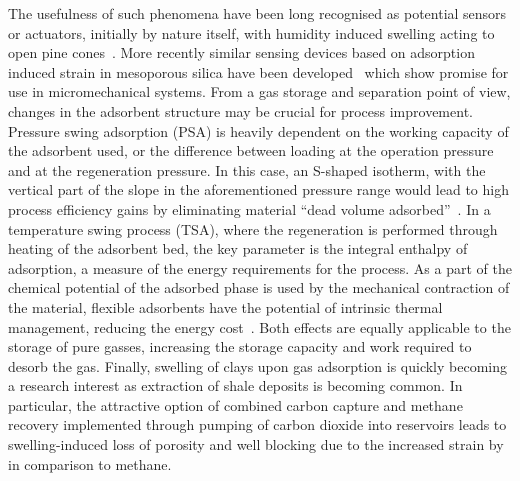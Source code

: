 The usefulness of such phenomena have been long recognised as potential
sensors or actuators, initially by nature itself, with humidity induced 
swelling acting to open pine cones~\cite{dawsonHowPineCones1997}. 
More recently similar sensing devices based on adsorption induced 
strain in mesoporous silica have been 
developed~\cite{boudotConvertingWaterAdsorption2016, %
ganserCantileverBendingBased2016} which show promise for use 
in micromechanical systems. From a gas storage and separation 
point of view, changes in the adsorbent structure may be crucial 
for process improvement. Pressure swing adsorption (PSA) is heavily 
dependent on the working capacity of the adsorbent used, or the
difference between loading at the operation pressure and at the 
regeneration pressure. In this case, an S-shaped isotherm, with 
the vertical part of the slope in the aforementioned pressure 
range would lead to high process efficiency gains by eliminating material
``dead volume adsorbed''~\cite{schneemannFlexibleMetalOrganic2014}. 
In a temperature swing process (TSA), where 
the regeneration is performed through heating of the adsorbent 
bed, the key parameter is the integral enthalpy of adsorption, a measure 
of the energy requirements for the process. As a part of the chemical 
potential of the adsorbed phase is used by the mechanical contraction
of the material, flexible adsorbents have the potential of
intrinsic thermal management, reducing the energy cost~\cite{masonMethaneStorageFlexible2015}.
Both effects are equally applicable to the storage of pure 
gasses, increasing the storage capacity and work required to
desorb the gas.
Finally, swelling of clays upon gas adsorption 
is quickly becoming a research interest as extraction of shale 
deposits is becoming common. In particular, the attractive option
of combined carbon capture and methane recovery implemented 
through pumping of carbon dioxide into reservoirs leads to swelling-induced
loss of porosity and well blocking due to the increased strain 
by  in comparison to methane. 
